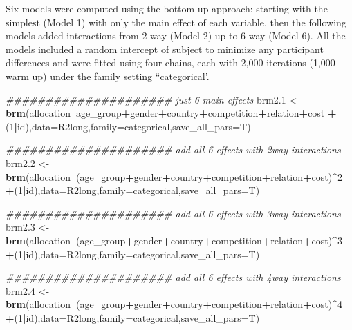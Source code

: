 \documentclass[
]{article}
\newenvironment{Shaded}{\begin{snugshade}}{\end{snugshade}}
\newcommand{\CommentTok}[1]{\textcolor[rgb]{0.56,0.35,0.01}{\textit{#1}}}
\newcommand{\DataTypeTok}[1]{\textcolor[rgb]{0.13,0.29,0.53}{#1}}
\newcommand{\DecValTok}[1]{\textcolor[rgb]{0.00,0.00,0.81}{#1}}
\newcommand{\FloatTok}[1]{\textcolor[rgb]{0.00,0.00,0.81}{#1}}
\newcommand{\KeywordTok}[1]{\textcolor[rgb]{0.13,0.29,0.53}{\textbf{#1}}}
\newcommand{\NormalTok}[1]{#1}
\newcommand{\OperatorTok}[1]{\textcolor[rgb]{0.81,0.36,0.00}{\textbf{#1}}}
\newcommand{\StringTok}[1]{\textcolor[rgb]{0.31,0.60,0.02}{#1}}
\begin{document}
Six models were computed using the bottom-up approach: starting with the
simplest (Model 1) with only the main effect of each variable, then the
following models added interactions from 2-way (Model 2) up to 6-way
(Model 6). All the models included a random intercept of subject to
minimize any participant differences and were fitted using four chains,
each with 2,000 iterations (1,000 warm up) under the family setting
``categorical'.

\begin{Shaded}
\begin{Highlighting}[]
\CommentTok{##################### just 6 main effects}
\NormalTok{brm2}\FloatTok{.1}\NormalTok{ <-}\StringTok{ }\KeywordTok{brm}\NormalTok{(allocation}\OperatorTok{~}\NormalTok{age_group}\OperatorTok{+}\NormalTok{gender}\OperatorTok{+}\NormalTok{country}\OperatorTok{+}\NormalTok{competition}\OperatorTok{+}\NormalTok{relation}\OperatorTok{+}\NormalTok{cost}
              \OperatorTok{+}\NormalTok{(}\DecValTok{1}\OperatorTok{|}\NormalTok{id),}\DataTypeTok{data=}\NormalTok{R2long,}\DataTypeTok{family=}\NormalTok{categorical,}\DataTypeTok{save_all_pars=}\NormalTok{T)}

\CommentTok{##################### add all 6 effects with 2way interactions}
\NormalTok{brm2}\FloatTok{.2}\NormalTok{ <-}\StringTok{ }\KeywordTok{brm}\NormalTok{(allocation}\OperatorTok{~}\NormalTok{(age_group}\OperatorTok{+}\NormalTok{gender}\OperatorTok{+}\NormalTok{country}\OperatorTok{+}\NormalTok{competition}\OperatorTok{+}\NormalTok{relation}\OperatorTok{+}\NormalTok{cost)}\OperatorTok{^}\DecValTok{2}
              \OperatorTok{+}\NormalTok{(}\DecValTok{1}\OperatorTok{|}\NormalTok{id),}\DataTypeTok{data=}\NormalTok{R2long,}\DataTypeTok{family=}\NormalTok{categorical,}\DataTypeTok{save_all_pars=}\NormalTok{T)}

\CommentTok{##################### add all 6 effects with 3way interactions}
\NormalTok{brm2}\FloatTok{.3}\NormalTok{ <-}\StringTok{ }\KeywordTok{brm}\NormalTok{(allocation}\OperatorTok{~}\NormalTok{(age_group}\OperatorTok{+}\NormalTok{gender}\OperatorTok{+}\NormalTok{country}\OperatorTok{+}\NormalTok{competition}\OperatorTok{+}\NormalTok{relation}\OperatorTok{+}\NormalTok{cost)}\OperatorTok{^}\DecValTok{3}
              \OperatorTok{+}\NormalTok{(}\DecValTok{1}\OperatorTok{|}\NormalTok{id),}\DataTypeTok{data=}\NormalTok{R2long,}\DataTypeTok{family=}\NormalTok{categorical,}\DataTypeTok{save_all_pars=}\NormalTok{T)}

\CommentTok{##################### add all 6 effects with 4way interactions}
\NormalTok{brm2}\FloatTok{.4}\NormalTok{ <-}\StringTok{ }\KeywordTok{brm}\NormalTok{(allocation}\OperatorTok{~}\NormalTok{(age_group}\OperatorTok{+}\NormalTok{gender}\OperatorTok{+}\NormalTok{country}\OperatorTok{+}\NormalTok{competition}\OperatorTok{+}\NormalTok{relation}\OperatorTok{+}\NormalTok{cost)}\OperatorTok{^}\DecValTok{4}
              \OperatorTok{+}\NormalTok{(}\DecValTok{1}\OperatorTok{|}\NormalTok{id),}\DataTypeTok{data=}\NormalTok{R2long,}\DataTypeTok{family=}\NormalTok{categorical,}\DataTypeTok{save_all_pars=}\NormalTok{T)}


\end{Highlighting}
\end{Shaded}
\end{document}
